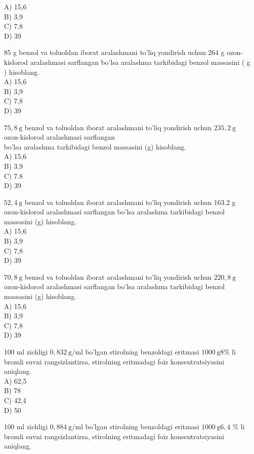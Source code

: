 A) 15,6\\
B) 3,9\\
C) 7,8\\
D) 39
  \item 85 g benzol va toluoldan iborat aralashmani to'liq yondirish uchun 264 g ozon-kislorod aralashmasi sarflangan bo'lsa aralashma tarkibidagi benzol massasini ( g ) hisoblang.\\
A) 15,6\\
B) 3,9\\
C) 7,8\\
D) 39
  \item $75,8 \mathrm{~g}$ benzol va toluoldan iborat aralashmani to'liq yondirish uchun $235,2 \mathrm{~g}$ ozon-kislorod aralashmasi sarflangan\\
bo'lsa aralashma tarkibidagi benzol massasini (g) hisoblang.\\
A) 15,6\\
B) 3,9\\
C) 7.8\\
D) 39
  \item $52,4 \mathrm{~g}$ benzol va toluoldan iborat aralashmani to'liq yondirish uchun 163.2 g ozon-kislorod aralashmasi sarflangan bo'lsa aralashma tarkibidagi benzol massasini (g) hisoblang.\\
A) 15,6\\
B) 3,9\\
C) 7,8\\
D) 39
  \item $70,8 \mathrm{~g}$ benzol va toluoldan iborat aralashmani to'liq yondirish uchun $220,8 \mathrm{~g}$ ozon-kislorod aralashmasi sarflangan bo'lsa aralashma tarkibidagi benzol massasini (g) hisoblang.\\
A) 15,6\\
B) 3,9\\
C) 7,8\\
D) 39
  \item 100 ml zichligi $0,832 \mathrm{~g} / \mathrm{ml}$ bo'lgan stirolning benzoldagi eritmasi $1000 \mathrm{~g} 8 \%$ li bromli suvni rangsizlantirsa, stirolning eritmadagi foiz konsentratsiyasini aniqlang.\\
A) 62,5\\
B) 78\\
C) 42,4\\
D) 50
  \item 100 ml zichligi $0,884 \mathrm{~g} / \mathrm{ml}$ bo'lgan stirolning benzoldagi eritmasi $1000 \mathrm{~g} 6,4$ \% li bromli suvni rangsizlantirsa, stirolning eritmadagi foiz konsentratsiyasini aniqlang.\\
